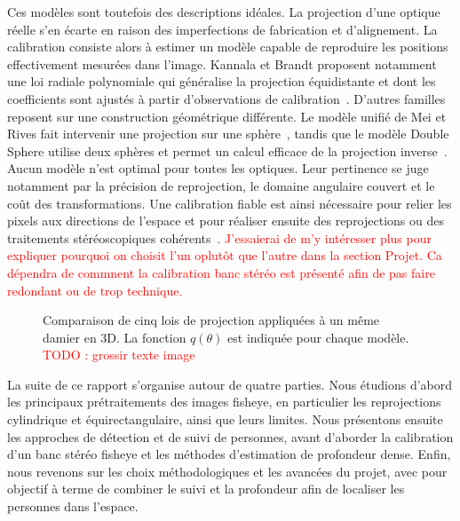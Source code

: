 \documentclass[11pt,a4paper]{article}
\begin{document}
Ces modèles sont toutefois des descriptions idéales. La projection d'une optique réelle s'en écarte en raison des imperfections de fabrication et d'alignement. La calibration consiste alors à estimer un modèle capable de reproduire les positions effectivement mesurées dans l'image. Kannala et Brandt proposent notamment une loi radiale polynomiale qui généralise la projection équidistante et dont les coefficients sont ajustés à partir d'observations de calibration~\cite{kannala2006}. D'autres familles reposent sur une construction géométrique différente. Le modèle unifié de Mei et Rives fait intervenir une projection sur une sphère~\cite{mei2007}, tandis que le modèle Double Sphere utilise deux sphères et permet un calcul efficace de la projection inverse~\cite{usenko2018}. Aucun modèle n'est optimal pour toutes les optiques. Leur pertinence se juge notamment par la précision de reprojection, le domaine angulaire couvert et le coût des transformations. Une calibration fiable est ainsi nécessaire pour relier les pixels aux directions de l'espace et pour réaliser ensuite des reprojections ou des traitements stéréoscopiques cohérents~\cite{schneider2009,yogamani2019}. \textcolor{red}{J'essaierai de m'y intéresser plus pour expliquer pourquoi on choisit l'un oplutôt que l'autre dans la section Projet. Ca dépendra de commnent la calibration banc stéréo est présenté afin de pas faire redondant ou de trop technique.}

\begin{figure}[H]
  \centering
  
  \caption{Comparaison de cinq lois de projection appliquées à un même damier en 3D. La fonction $q(\theta)$ est indiquée pour chaque modèle. \textcolor{red}{TODO : grossir texte image}}
  \label{fig:comparaison-projections}
\end{figure}


La suite de ce rapport s'organise autour de quatre parties. Nous étudions d'abord les principaux prétraitements des images fisheye, en particulier les reprojections cylindrique et équirectangulaire, ainsi que leurs limites. Nous présentons ensuite les approches de détection et de suivi de personnes, avant d'aborder la calibration d'un banc stéréo fisheye et les méthodes d'estimation de profondeur dense. Enfin, nous revenons sur les choix méthodologiques et les avancées du projet, avec pour objectif à terme de combiner le suivi et la profondeur afin de localiser les personnes dans l'espace.
\end{document}
